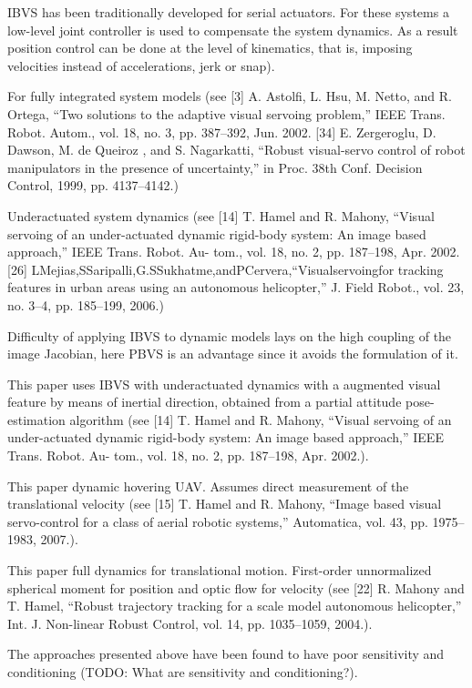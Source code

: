 IBVS has been traditionally developed for serial actuators. For these systems a low-level joint controller is used to compensate the system dynamics. As a result position control can be done at the level of kinematics, that is, imposing velocities instead of accelerations, jerk or snap). 

For fully integrated system models (see [3] A. Astolfi, L. Hsu, M. Netto, and R. Ortega, “Two solutions to the adaptive visual servoing problem,” IEEE Trans. Robot. Autom., vol. 18, no. 3, pp. 387–392, Jun. 2002. 
[34] E. Zergeroglu, D. Dawson, M. de Queiroz , and S. Nagarkatti, “Robust visual-servo control of robot manipulators in the presence of uncertainty,” in Proc. 38th Conf. Decision Control, 1999, pp. 4137–4142.)

Underactuated system dynamics (see [14] T. Hamel and R. Mahony, “Visual servoing of an under-actuated dynamic rigid-body system: An image based approach,” IEEE Trans. Robot. Au- tom., vol. 18, no. 2, pp. 187–198, Apr. 2002. [26] LMejias,SSaripalli,G.SSukhatme,andPCervera,“Visualservoingfor tracking features in urban areas using an autonomous helicopter,” J. Field Robot., vol. 23, no. 3–4, pp. 185–199, 2006.)

Difficulty of applying IBVS to dynamic models lays on the high coupling of the image Jacobian, here PBVS is an advantage since it avoids the formulation of it.

This paper uses IBVS with underactuated dynamics with a augmented visual feature by means of inertial direction, obtained from a partial attitude pose-estimation algorithm (see [14] T. Hamel and R. Mahony, “Visual servoing of an under-actuated dynamic rigid-body system: An image based approach,” IEEE Trans. Robot. Au- tom., vol. 18, no. 2, pp. 187–198, Apr. 2002.).

This paper dynamic hovering UAV. Assumes direct measurement  of the translational velocity (see [15] T. Hamel and R. Mahony, “Image based visual servo-control for a class of aerial robotic systems,” Automatica, vol. 43, pp. 1975–1983, 2007.).

This paper full dynamics for translational motion. First-order unnormalized spherical moment for position and optic flow for velocity (see [22] R. Mahony and T. Hamel, “Robust trajectory tracking for a scale model autonomous helicopter,” Int. J. Non-linear Robust Control, vol. 14, pp. 1035–1059, 2004.).

The approaches presented above have been found to have poor sensitivity and conditioning (TODO: What are sensitivity and conditioning?).

